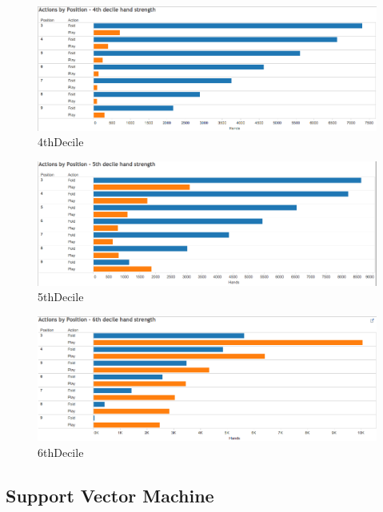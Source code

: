 \documentclass[twoside]{article}
\begin{document}
\begin{multicols}{2}
\begin{figure}[H]
  \centering
  \centerline{\includegraphics[width=1.1\columnwidth]{4thDecile.png}}
   \caption{4thDecile}
  \label{fig:4thDecile}
\end{figure}

\begin{figure}[H]
  \centering
  \centerline{\includegraphics[width=1.1\columnwidth]{5thDecile.png}}
   \caption{5thDecile}
  \label{fig:5thDecile}
\end{figure}

\begin{figure}[H]
  \centering
  \centerline{\includegraphics[width=1.1\columnwidth]{6thDecile.png}}
   \caption{6thDecile}
  \label{fig:6thDecile}
\end{figure}

\subsection{Support Vector Machine}


\end{multicols}
\end{document}

